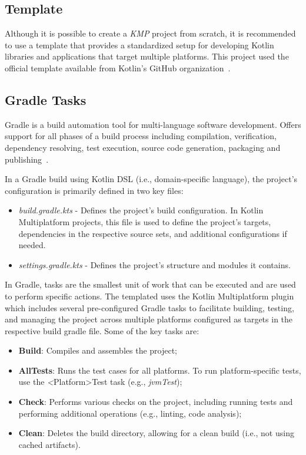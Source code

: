 \subsection{Template}\label{subsec:template}

Although it is possible to create a \textit{KMP} project from scratch, it is recommended to use a template that provides a standardized setup for developing Kotlin libraries and applications that target multiple platforms.
This project used the official template available from Kotlin's GitHub organization~\cite{kmp-github-template}.

\subsection{Gradle Tasks}\label{subsec:available-gradle-tasks}

Gradle is a build automation tool for multi-language software development.
Offers support for all phases of a build process including compilation, verification, dependency resolving, test execution, source code generation, packaging and publishing~\cite{wiki:gradle}.

In a Gradle build using Kotlin DSL (i.e., domain-specific language), the project's configuration is primarily defined in two key files:

\begin{itemize}
    \item \textit{build.gradle.kts} - Defines the project's build configuration.
    In Kotlin Multiplatform projects, this file is used to define the project's targets, dependencies in the respective source sets, and additional configurations if needed.
    \item \textit{settings.gradle.kts} - Defines the project's structure and modules it contains.
\end{itemize}

In Gradle, tasks are the smallest unit of work that can be executed and are used to perform specific actions.
The templated uses the Kotlin Multiplatform plugin which includes several pre-configured Gradle tasks to facilitate building, testing, and managing the project across multiple platforms configured as targets in the respective build gradle file.
Some of the key tasks are:

\begin{itemize}
    \item \textbf{Build}: Compiles and assembles the project;
    \item \textbf{AllTests}: Runs the test cases for all platforms.
    To run platform-specific tests, use the \textit \textless Platform\textgreater Test task (e.g., \textit{jvmTest});
    \item \textbf{Check}: Performs various checks on the project, including running tests and performing additional operations (e.g., linting, code analysis);
    \item \textbf{Clean}: Deletes the build directory, allowing for a clean build (i.e., not using cached artifacts).
\end{itemize}

